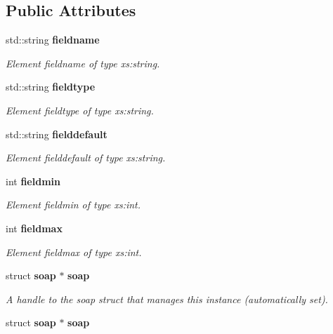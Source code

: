 \subsection*{Public Attributes}
\begin{CompactItemize}
\item 
std::string {\bf fieldname}
\begin{CompactList}\small\item\em Element fieldname of type xs:string. \item\end{CompactList}\item 
std::string {\bf fieldtype}
\begin{CompactList}\small\item\em Element fieldtype of type xs:string. \item\end{CompactList}\item 
std::string {\bf fielddefault}
\begin{CompactList}\small\item\em Element fielddefault of type xs:string. \item\end{CompactList}\item 
int {\bf fieldmin}
\begin{CompactList}\small\item\em Element fieldmin of type xs:int. \item\end{CompactList}\item 
int {\bf fieldmax}
\begin{CompactList}\small\item\em Element fieldmax of type xs:int. \item\end{CompactList}\item 
struct {\bf soap} $\ast$ {\bf soap}\label{classns2____PluginField_9c60bb8a67cc9344b7725719e2f30fb9}

\begin{CompactList}\small\item\em A handle to the soap struct that manages this instance (automatically set). \item\end{CompactList}\item 
struct {\bf soap} $\ast$ \textbf{soap}\label{classns2____PluginField_9c60bb8a67cc9344b7725719e2f30fb9}

\end{CompactItemize}


